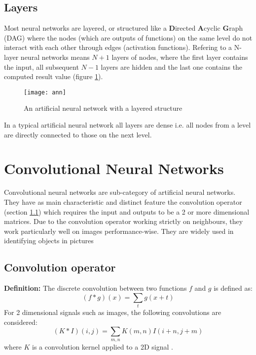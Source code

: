 \subsection{Layers}
\label{subsec:obj_nn_layers}

\qquad Most neural networks are layered, or structured like a \textbf{D}irected \textbf{A}cyclic \textbf{G}raph (DAG) where the nodes (which are outputs of functions) on the same level do not interact with each other through edges (activation functions). Refering to a N-layer neural networks means $N+1$ layers of nodes, where the first layer contains the input, all subsequent $N-1$ layers are hidden and the last one contains the computed result value (figure \ref{fig:ann}).

\begin{figure}[b!]
\centering
\texttt{[image: ann]}
\caption{An artificial neural network with a layered structure}
\label{fig:ann}
\end{figure}

\qquad In a typical artificial neural network all layers are dense i.e. all nodes from a level are directly connected to those on the next level.

\section{Convolutional Neural Networks}
\label{sec:obj_cnn}

\qquad Convolutional neural networks are sub-category of artificial neural networks. They have as main characteristic and distinct feature the convolution operator (section \ref{subsec:obj_cnn_conv}) which requires the input and outputs to be a 2 or more dimensional matrices. Due to the convolution operator working strictly on neighbours, they work particularly well on images performance-wise. They are widely used in identifying objects in pictures

\subsection{Convolution operator}
\label{subsec:obj_cnn_conv}

\qquad \textbf{Definition:} The discrete convolution between two functions $f$ and $g$ is defined as: 
\[ (f * g)(x) = \sum_{t}{g(x + t)} \] 
For 2 dimensional signals such as images, the following convolutions are considered: 
\[ (K * I)(i, j) = \sum_{m,n}{K(m, n)I(i + n, j + m)}\]
where $K$ is a convolution kernel applied to a 2D signal \cite{toulouse-nn}.

